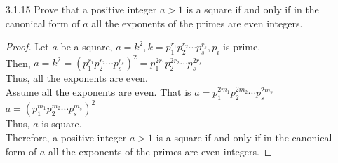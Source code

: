 \documentclass[12pt]{article}
\begin{document}
\begin{enumerate}
\begin{proof}
\begin{enumerate}
			\item [Case 1:] $ r = 1, p=10q+ 1 \Rightarrow p^2 - 1 =100q^2+20q=10(10q^2+2q+0)\Rightarrow 10 | (p^2-1) $.
			\item [Case 2:] $ r = 3, p=10q+ 3 \Rightarrow p^2 + 1 =100q^2+60q+10=10(10q^2+6q+1)\Rightarrow 10 | (p^2+1) $.
			\item [Case 3:] $ r = 7, p=10q+ 7 \Rightarrow p^2 + 1 =100q^2+140q+50=10(10q^2+14q+5)\Rightarrow 10 | (p^2+1) $.
			\item [Case 4:] $ r = 9, p=10q+ 9 \Rightarrow p^2 - 1 =100q^2+180q+80=10(10q^2+18q+8)\Rightarrow 10 | (p^2-1) $.
		\end{enumerate}
		Therefore, in all cases either $ 10|(p^2-1) $ or $ 10|(p^2+1) $
	\end{proof}
	\item[3.1.15] Prove that a positive integer $ a > 1 $ is a square if and only if in the canonical form of $ a $ all the exponents of the primes are even integers.
	\begin{proof}
		Let $ a $ be a square, $ a=k^2 , k=p_1^{r_1}p_2^{r_2}\cdots p_s^{r_s} , p_i$ is prime.\\ Then, $ a=k^2=(p_1^{r_1}p_2^{r_2}\cdots p_s^{r_s})^2=p_1^{2r_1}p_2^{2r_2}\cdots p_s^{2r_s} $\\
		Thus, all the exponents are even.
		\\
		Assume all the exponents are even. That is $ a = p_1^{2m_1}p_2^{2m_2}\cdots p_s^{2m_s}$\\
		$ a=(p_1^{m_1}p_2^{m_2}\cdots p_s^{m_s})^2 $\\
		Thus, $ a $ is square.\\
		Therefore, a positive integer $ a > 1 $ is a square if and only if in the canonical form of $ a $ all the exponents of the primes are even integers.
	\end{proof}
\end{enumerate}
\end{document}
